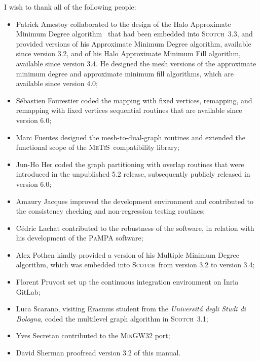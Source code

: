 \documentclass{article}
\newcommand{\scotch}{\textsc{Scotch}}               %
\newcommand{\metis}{\mbox{\textsc{Me$\!$T$\!$iS}}}  %
\begin{document}
I wish to thank all of the following people:
\begin{itemize}
\item
Patrick Amestoy collaborated to the design of the Halo Approximate
Minimum Degree algorithm~\cite{peroam99} that had been embedded into
\scotch\ \textsc{3.3}, and provided versions of his Approximate Minimum
Degree algorithm, available since version \textsc{3.2}, and of his
Halo Approximate Minimum Fill algorithm, available since version
\textsc{3.4}. He designed the mesh versions of the approximate
minimum degree and approximate minimum fill algorithms, which are
available since version \textsc{4.0};
\item
S\'ebastien Fourestier coded the mapping with fixed vertices,
remapping, and remapping with fixed vertices sequential routines that
are available since version \textsc{6.0};
\item
Marc Fuentes designed the mesh-to-dual-graph routines and extended the
functional scope of the \metis\ compatibility library;
\item
Jun-Ho Her coded the graph partitioning with overlap routines that
were introduced in the unpublished \textsc{5.2} release, subsequently
publicly released in version \textsc{6.0};
\item
Amaury Jacques improved the development environment and contributed to
the consistency checking and non-regression testing routines;
\item
C\'edric Lachat contributed to the robustness of the software, in
relation with his development of the \textsc{PaMPA} software;
\item
Alex Pothen kindly provided a version of his Multiple Minimum Degree
algorithm, which was embedded into \scotch\ from version \textsc{3.2} to
version \textsc{3.4};
\item
Florent Pruvost set up the continuous integration environment on
Inria GitLab;
\item
Luca Scarano, visiting Erasmus student from the \textit{Universit\'a
degli Studi di Bologna}, coded the multilevel graph algorithm
in \scotch\ \textsc{3.1};
\item
Yves Secretan contributed to the \textsc{MinGW32} port;
\item
David Sherman proofread version \textsc{3.2} of this manual.
\end{itemize}




\end{document}
